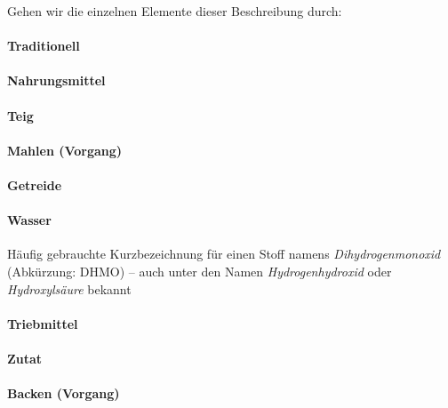 \documentclass{scrbook}
\begin{document}
Gehen wir die einzelnen Elemente dieser Beschreibung durch:

\paragraph{Traditionell} %

\paragraph{Nahrungsmittel} %

\paragraph{Teig} %

\paragraph{Mahlen (Vorgang)} %

\paragraph{Getreide} %

\paragraph{Wasser} Häufig gebrauchte Kurzbezeichnung für einen Stoff namens \emph{Dihydrogenmonoxid} (Abkürzung: DHMO) -- auch unter den Namen \emph{Hydrogenhydroxid} oder \emph{Hydroxylsäure} bekannt

\paragraph{Triebmittel} %

\paragraph{Zutat} %

\paragraph{Backen (Vorgang)} %
\end{document}
